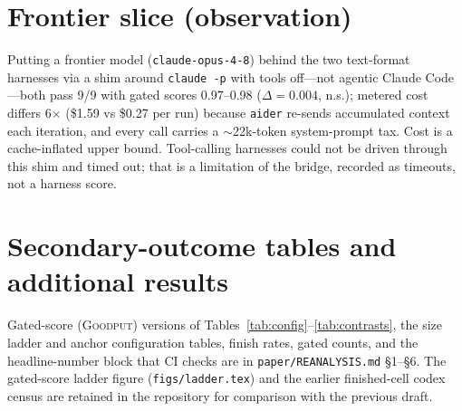 \documentclass[10pt]{article}
\newcommand{\goodput}{\textsc{Goodput}}
\begin{document}
\section{Frontier slice (observation)}
\label{app:frontier}
Putting a frontier model (\texttt{claude-opus-4-8}) behind the two text-format harnesses via a shim
around \texttt{claude -p} with tools off---not agentic Claude Code---both pass 9/9 with gated scores
0.97--0.98 ($\Delta{=}0.004$, n.s.); metered cost differs 6$\times$ (\$1.59 vs \$0.27 per run) because
\texttt{aider} re-sends accumulated context each iteration, and every call carries a $\sim$22k-token
system-prompt tax. Cost is a cache-inflated upper bound. Tool-calling harnesses could not be driven
through this shim and timed out; that is a limitation of the bridge, recorded as timeouts, not a
harness score.

\section{Secondary-outcome tables and additional results}
\label{app:secondary}
Gated-score (\goodput{}) versions of Tables~\ref{tab:config}--\ref{tab:contrasts}, the size ladder
and anchor configuration tables, finish rates, gated counts, and the headline-number block that CI
checks are in \texttt{paper/REANALYSIS.md} \S1--\S6. The gated-score ladder figure
(\texttt{figs/ladder.tex}) and the earlier finished-cell codex census are retained in the repository
for comparison with the previous draft.
\endgroup
\end{document}
